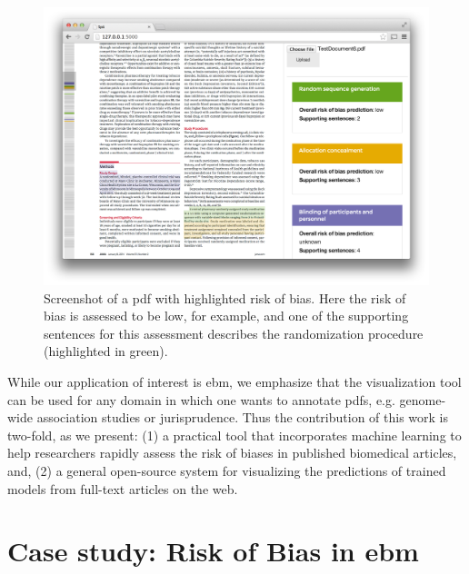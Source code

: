 \documentclass[runningheads,a4paper]{llncs}
\begin{document}
\begin{figure}[htb]
\vspace{-1em}
\centering
\includegraphics[width=0.8\linewidth]{./images/screenshot2.png}
\vspace{-1em}
\caption{\label{fig:screenshot}Screenshot of a \ac{pdf} with highlighted risk of bias. Here the risk of bias is assessed to be low, for example, and one of the supporting sentences for this assessment describes the randomization procedure (highlighted in green).}
\vspace{-1.5em}
\end{figure}

While our application of interest is \ac{ebm}, we emphasize that the visualization tool can be used for any domain in which one wants to annotate \acp{pdf}, e.g. genome-wide association studies or jurisprudence.
Thus the contribution of this work is two-fold, as we present:
(1) a practical tool that incorporates machine learning to help researchers rapidly assess the risk of biases in published biomedical articles, and,
(2) a general open-source system for visualizing the predictions of trained models from full-text articles on the web.

\section{Case study: Risk of Bias in \acl{ebm}}
\label{section:EBM-ML}
\end{document}
